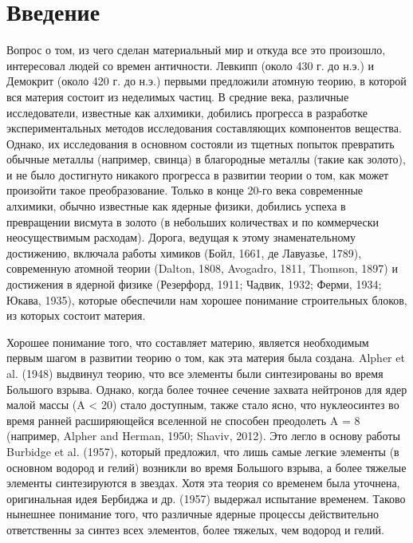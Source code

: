 \documentclass[%
bachelor,    %
natbib,      %
subf,        %
href,        %
colorlinks,  %
]{disser}
\begin{document}
\section*{\centering Введение}

Вопрос о том, из чего сделан материальный мир и откуда все это произошло, интересовал людей со времен античности. Левкипп (около 430 г. до н.э.) и Демокрит
(около 420 г. до н.э.) первыми предложили атомную теорию, в которой вся материя состоит из
неделимых частиц. В средние века, различные исследователи, известные как алхимики, добились прогресса
в разработке экспериментальных методов исследования составляющих компонентов вещества. Однако,
их исследования в основном состояли из тщетных попыток превратить обычные металлы
(например, свинца) в благородные металлы (такие как золото), и не было достигнуто никакого прогресса в
развитии теории о том, как может произойти такое преобразование. Только в конце 20-го века современные алхимики, обычно
известные как ядерные физики, добились успеха в превращении висмута в золото
(в небольших количествах и по коммерчески неосуществимым расходам). Дорога, ведущая к этому знаменательному достижению, включала работы химиков (Бойл, 1661, де Лавуазье, 1789), современную атомной теории (Dalton, 1808, Avogadro, 1811, Thomson, 1897) и достижения в ядерной физике (Резерфорд, 1911; Чадвик, 1932; Ферми, 1934; Юкава, 1935), которые обеспечили нам хорошее понимание строительных блоков, из которых состоит материя.

Хорошее понимание того, что составляет материю, является необходимым первым шагом в развитии теорию о том, как эта материя была создана.  Alpher et al. (1948) выдвинул теорию, что все элементы были синтезированы во время Большого взрыва. Однако, когда более точнее сечение захвата нейтронов для ядер малой массы (A < 20) стало доступным, также стало ясно, что нуклеосинтез во время ранней расширяющейся вселенной не способен преодолеть A = 8 (например, Alpher and Herman, 1950; Shaviv, 2012). Это легло в основу работы Burbidge et al. (1957), который предложил, что лишь самые легкие элементы (в основном водород и гелий) возникли во время Большого взрыва, а более тяжелые элементы синтезируются в звездах. Хотя эта теория со временем была уточнена, оригинальная идея Бербиджа и др. (1957) выдержал испытание временем. Таково нынешнее понимание того, что различные ядерные процессы действительно ответственны за синтез всех элементов, более тяжелых, чем водород и гелий.
\end{document}
